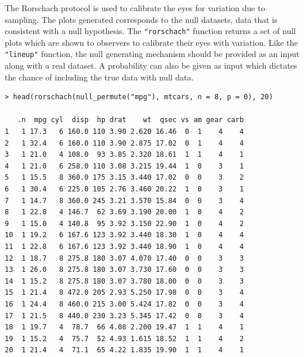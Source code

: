 \documentclass[article]{jss}
\begin{document}
The Rorschach protocol is used to calibrate the eyes for variation due
to sampling. The plots generated corresponds to the null datasets, data
that is consistent with a null hypothesis. The \texttt{"rorschach"}
function returns a set of null plots which are shown to observers to
calibrate their eyes with variation. Like the \texttt{"lineup"}
function, the null generating mechanism should be provided as an input
along with a real dataset. A probability can also be given as input
which dictates the chance of including the true data with null data.

\begin{verbatim}
> head(rorschach(null_permute("mpg"), mtcars, n = 8, p = 0), 20)

   .n  mpg cyl  disp  hp drat    wt  qsec vs am gear carb
1   1 17.3   6 160.0 110 3.90 2.620 16.46  0  1    4    4
2   1 32.4   6 160.0 110 3.90 2.875 17.02  0  1    4    4
3   1 21.0   4 108.0  93 3.85 2.320 18.61  1  1    4    1
4   1 21.0   6 258.0 110 3.08 3.215 19.44  1  0    3    1
5   1 15.5   8 360.0 175 3.15 3.440 17.02  0  0    3    2
6   1 30.4   6 225.0 105 2.76 3.460 20.22  1  0    3    1
7   1 14.7   8 360.0 245 3.21 3.570 15.84  0  0    3    4
8   1 22.8   4 146.7  62 3.69 3.190 20.00  1  0    4    2
9   1 15.0   4 140.8  95 3.92 3.150 22.90  1  0    4    2
10  1 19.2   6 167.6 123 3.92 3.440 18.30  1  0    4    4
11  1 22.8   6 167.6 123 3.92 3.440 18.90  1  0    4    4
12  1 18.7   8 275.8 180 3.07 4.070 17.40  0  0    3    3
13  1 26.0   8 275.8 180 3.07 3.730 17.60  0  0    3    3
14  1 15.2   8 275.8 180 3.07 3.780 18.00  0  0    3    3
15  1 21.4   8 472.0 205 2.93 5.250 17.98  0  0    3    4
16  1 24.4   8 460.0 215 3.00 5.424 17.82  0  0    3    4
17  1 21.5   8 440.0 230 3.23 5.345 17.42  0  0    3    4
18  1 19.7   4  78.7  66 4.08 2.200 19.47  1  1    4    1
19  1 15.2   4  75.7  52 4.93 1.615 18.52  1  1    4    2
20  1 21.4   4  71.1  65 4.22 1.835 19.90  1  1    4    1
\end{verbatim}
\end{document}

